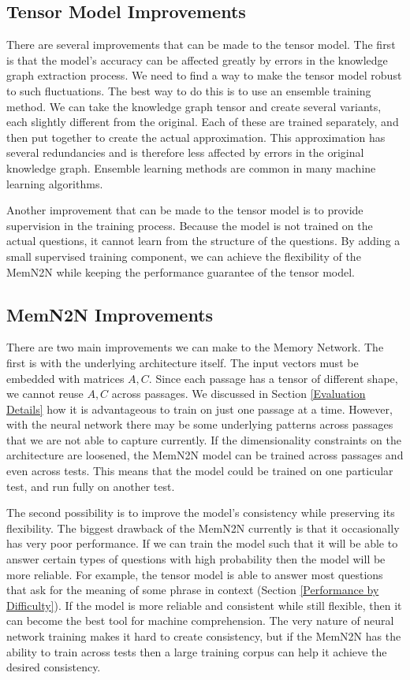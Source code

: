\documentclass[pageno]{final_paper}
\begin{document}
\subsection{Tensor Model Improvements}
\label{Tensor Model Improvements}

There are several improvements that can be made to the tensor model. The first
is that the model's accuracy can be affected greatly by errors in the knowledge
graph extraction process. We need to find a way to make the tensor model robust
to such fluctuations. The best way to do this is to use an ensemble training
method. We can take the knowledge graph tensor and create several variants, each
slightly different from the original. Each of these are trained separately, and
then put together to create the actual approximation. This approximation has
several redundancies and is therefore less affected by errors in the original
knowledge graph. Ensemble learning methods are common in many machine learning
algorithms.

Another improvement that can be made to the tensor model is to provide
supervision in the training process. Because the model is not trained on the
actual questions, it cannot learn from the structure of the questions. By adding
a small supervised training component, we can achieve the flexibility of the
MemN2N while keeping the performance guarantee of the tensor model.

\subsection{MemN2N Improvements}
\label{MemN2N Improvements}

There are two main improvements we can make to the Memory Network. The first is
with the underlying architecture itself. The input vectors must be embedded with
matrices $A,C$. Since each passage has a tensor of different shape, we cannot
reuse $A,C$ across passages. We discussed in Section \ref{Evaluation Details}
how it is advantageous to train on just one passage at a time. However, with the
neural network there may be some underlying patterns across passages that we are
not able to capture currently. If the dimensionality constraints on the
architecture are loosened, the MemN2N model can be trained across passages and
even across tests. This means that the model could be trained on one particular
test, and run fully on another test.

The second possibility is to improve the model's consistency while preserving
its flexibility. The biggest drawback of the MemN2N currently is that it
occasionally has very poor performance. If we can train the model such that it
will be able to answer certain types of questions with high probability then the
model will be more reliable. For example, the tensor model is able to answer
most questions that ask for the meaning of some phrase in context (Section
\ref{Performance by Difficulty}). If the model is more reliable and consistent
while still flexible, then it can become the best tool for machine
comprehension. The very nature of neural network training makes it hard to
create consistency, but if the MemN2N has the ability to train across tests then
a large training corpus can help it achieve the desired consistency.
\end{document}
